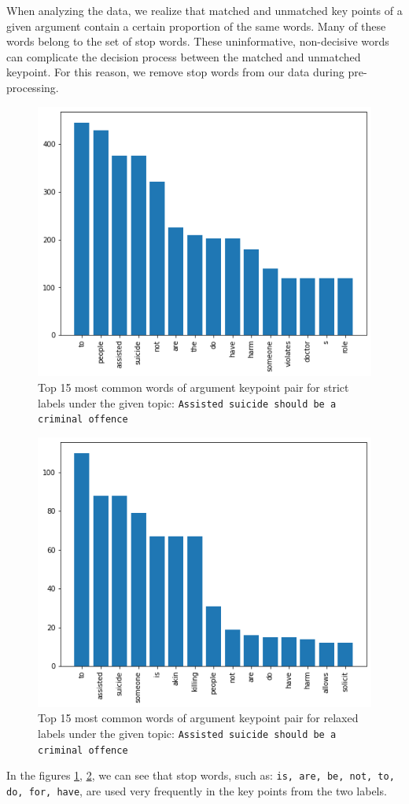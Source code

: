 When analyzing the data, we realize that matched and unmatched key points of a given argument contain a certain proportion of the same words. 
Many of these words belong to the set of stop words. 
These uninformative, non-decisive words can complicate the decision process between the matched and unmatched keypoint. 
For this reason, we remove stop words from our data during pre-processing. 
\begin{figure}[h]
	\label{fig:stopwords-strict}
	\caption{Top 15 most common words of argument keypoint pair for strict labels under the given topic: \texttt{Assisted suicide should be a criminal offence}}
	\includegraphics[scale=0.4]{figures/data_stopwords1.png}
\end{figure}
\begin{figure}[h]
	\label{fig:stopwords-relaxed}
	\caption{Top 15 most common words of argument keypoint pair for relaxed labels under the given topic: \texttt{Assisted suicide should be a criminal offence}}
	\includegraphics[scale=0.4]{figures/data_stopwords2.png}
\end{figure}
In the figures \ref{fig:stopwords-strict}, \ref{fig:stopwords-relaxed}, we can see that stop words, such as: \texttt{is, are, be, not, to, do, for, have}, are used very frequently in the key points from the two labels. 

